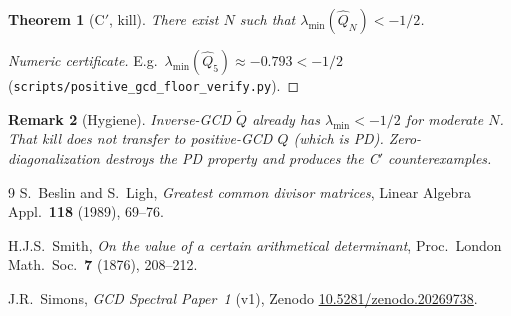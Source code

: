 \documentclass[11pt]{article}
\newtheorem{theorem}{Theorem}[section]
\newtheorem{remark}[theorem]{Remark}
\begin{document}
\begin{theorem}[C$'$, kill]\label{thm:Cp}
There exist $N$ such that $\lambda_{\min}(\widehat Q_N)<-1/2$.
\end{theorem}

\begin{proof}[Numeric certificate]
E.g.\ $\lambda_{\min}(\widehat Q_5)\approx -0.793<-1/2$
(\texttt{scripts/positive\_gcd\_floor\_verify.py}).
\end{proof}

\begin{remark}[Hygiene]
Inverse-GCD $\widetilde Q$ already has $\lambda_{\min}<-1/2$ for moderate $N$.
That kill does \emph{not} transfer to positive-GCD $Q$ (which is PD).
Zero-diagonalization destroys the PD property and produces the C$'$ counterexamples.
\end{remark}

\begin{thebibliography}{9}
S.~Beslin and S.~Ligh,
\textit{Greatest common divisor matrices},
Linear Algebra Appl.\ \textbf{118} (1989), 69--76.

H.J.S.~Smith,
\textit{On the value of a certain arithmetical determinant},
Proc.\ London Math.\ Soc.\ \textbf{7} (1876), 208--212.

J.R.~Simons,
\textit{GCD Spectral Paper~1} (v1),
Zenodo \href{https://doi.org/10.5281/zenodo.20269738}{10.5281/zenodo.20269738}.
\end{thebibliography}
\end{document}
